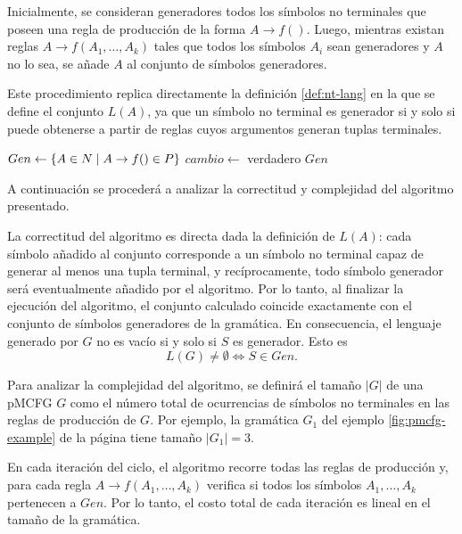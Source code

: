 Inicialmente, se consideran generadores todos los símbolos no terminales que poseen una regla de producción de la forma $A \to f()$. Luego, mientras existan reglas $A \to f(A_1, \ldots, A_k)$ tales que todos los símbolos $A_i$ sean generadores y $A$ no lo sea, se añade $A$ al conjunto de símbolos generadores.

Este procedimiento replica directamente la definición \ref{def:nt-lang} en la que se define el conjunto $L(A)$, ya que un símbolo no terminal es generador si y solo si puede obtenerse a partir de reglas cuyos argumentos generan tuplas terminales.

\begin{algorithm}[H]
    \caption{Determinación de símbolos generadores en una pMCFG}
     $Gen \gets \{ A \in N \;|\; A \to f() \in P \}$\; $cambio \gets$ verdadero\;
    \Return $Gen$\;
\end{algorithm}

A continuación se procederá a analizar la correctitud y complejidad del algoritmo presentado.

La correctitud del algoritmo es directa dada la definición de $L(A)$: cada símbolo añadido al conjunto corresponde a un símbolo no terminal capaz de generar al menos una tupla terminal, y recíprocamente, todo símbolo generador será eventualmente añadido por el algoritmo. Por lo tanto, al finalizar la ejecución del algoritmo, el conjunto calculado coincide exactamente con el conjunto de símbolos generadores de la gramática. En consecuencia, el lenguaje generado por $G$ no es vacío si y solo si $S$ es generador. Esto es
$$
    L(G) \neq \emptyset \iff S \in Gen.
$$

Para analizar la complejidad del algoritmo, se definirá el tamaño $|G|$ de una pMCFG $G$ como el número total de ocurrencias de símbolos no terminales en las reglas de producción de $G$. Por ejemplo, la gramática $G_1$ del ejemplo \ref{fig:pmcfg-example} de la página \pageref{fig:pmcfg-example} tiene tamaño $|G_1| = 3$.

En cada iteración del ciclo, el algoritmo recorre todas las reglas de producción y, para cada regla $A \to f(A_1, \ldots, A_k)$ verifica si todos los símbolos $A_1, \ldots, A_k$ pertenecen a $Gen$. Por lo tanto, el costo total de cada iteración es lineal en el tamaño de la gramática.

